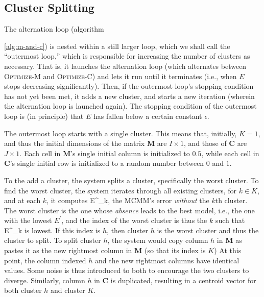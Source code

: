 \subsection{Cluster Splitting}
\label{sec:cl-split}
The alternation loop (algorithm~{\ref{alg:m-and-c}) is nested within a still larger loop, which we shall call the ``outermost loop,'' which is responsible for increasing the number of clusters as necessary. That is, it launches the alternation loop (which alternates between \textsc{Optimize-M} and \textsc{Optimize-C}) and lets it run until it terminates (i.e., when $E$ stops decreasing significantly). Then, if the outermost loop's stopping condition has not yet been met, it adds a new cluster, and starts a new iteration (wherein the alternation loop is launched again). The stopping condition of the outermost loop is (in principle) that $E$ has fallen below a certain constant $\epsilon$.

 The outermost loop starts with a single cluster. This means that, initially, 
 $K = 1$, and thus the initial dimensions of the matrix $\textbf{M}$ are 
 $I \times 1$, and those of $\textbf{C}$ are $J \times 1$. Each cell in $\textbf{M}$'s 
 single initial column is initialized to $0.5$, while each cell in $\textbf{C}$'s 
 single initial row is initialized to a random number between $0$ and $1$.  

To the add a cluster, the system splits a cluster, specifically the worst cluster. To find the worst cluster, 
 the system iterates through all existing clusters, for $k \in K$, and at each $k$, 
it computes E^{\prime}_{k}, the MCMM's error \emph{without} the 
 $k$th cluster.  The worst cluster is the one whose \emph{absence} leads to the best model, 
 i.e., the one with the lowest $E^{\prime}$, and the index of the worst cluster is thus the 
 $k$ such that E^{\prime}_{k} is lowest. If this index is $h$, then cluster $h$ is the worst cluster and thus the cluster to split. To split cluster $h$, 
 the system would copy column $h$ in $\textbf{M}$ as pastes it as the new 
 rightmost column in $\textbf{M}$ (so that its index is $K$)  At this point, 
 the column indexed $h$ and the new rightmost columns have identical values.  
 Some noise is thus introduced to both to encourage the two clusters to diverge. 
 Similarly, column $h$ in $\textbf{C}$ is duplicated, resulting in a centroid vector 
 for both cluster $h$ and cluster $K$.
 
}
